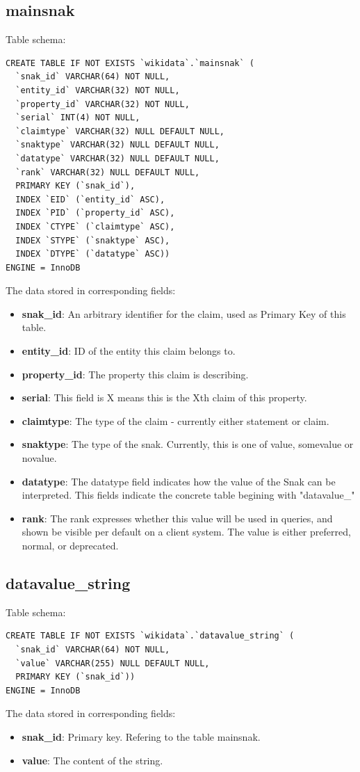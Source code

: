 \documentclass[12pt]{article}
\begin{document}
\subsection{mainsnak}
\lstset{language=SQL}
Table schema:
\begin{lstlisting}
CREATE TABLE IF NOT EXISTS `wikidata`.`mainsnak` (
  `snak_id` VARCHAR(64) NOT NULL,
  `entity_id` VARCHAR(32) NOT NULL,
  `property_id` VARCHAR(32) NOT NULL,
  `serial` INT(4) NOT NULL,
  `claimtype` VARCHAR(32) NULL DEFAULT NULL,
  `snaktype` VARCHAR(32) NULL DEFAULT NULL,
  `datatype` VARCHAR(32) NULL DEFAULT NULL,
  `rank` VARCHAR(32) NULL DEFAULT NULL,
  PRIMARY KEY (`snak_id`),
  INDEX `EID` (`entity_id` ASC),
  INDEX `PID` (`property_id` ASC),
  INDEX `CTYPE` (`claimtype` ASC),
  INDEX `STYPE` (`snaktype` ASC),
  INDEX `DTYPE` (`datatype` ASC))
ENGINE = InnoDB
\end{lstlisting}
The data stored in corresponding fields:
\begin{itemize}
\item \textbf{snak\_id}: An arbitrary identifier for the claim, used as Primary Key of this table.
\item \textbf{entity\_id}: ID of the entity this claim belongs to.
\item \textbf{property\_id}: The property this claim is describing.
\item \textbf{serial}: This field is X means this is the Xth claim of this property.
\item \textbf{claimtype}: The type of the claim - currently either statement or claim.
\item \textbf{snaktype}: The type of the snak. Currently, this is one of value, somevalue or novalue.
\item \textbf{datatype}: The datatype field indicates how the value of the Snak can be interpreted. This fields indicate the concrete table begining with "datavalue\_"
\item \textbf{rank}: The rank expresses whether this value will be used in queries, and shown be visible per default on a client system. The value is either preferred, normal, or deprecated.
\end{itemize}
\subsection{datavalue\_string}
\lstset{language=SQL}
Table schema:
\begin{lstlisting}
CREATE TABLE IF NOT EXISTS `wikidata`.`datavalue_string` (
  `snak_id` VARCHAR(64) NOT NULL,
  `value` VARCHAR(255) NULL DEFAULT NULL,
  PRIMARY KEY (`snak_id`))
ENGINE = InnoDB
\end{lstlisting}
The data stored in corresponding fields:
\begin{itemize}
\item \textbf{snak\_id}: Primary key. Refering to the table mainsnak.
\item \textbf{value}: The content of the string.
\end{itemize}
\end{document}
